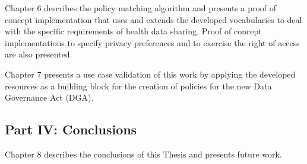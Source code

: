 Chapter 6 describes the policy matching algorithm and presents a proof of concept implementation that uses and extends the developed vocabularies to deal with the specific requirements of health data sharing.
Proof of concept implementations to specify privacy preferences and to exercise the right of access are also presented.

Chapter 7 presents a use case validation of this work by applying the developed resources as a building block for the creation of policies for the new Data Governance Act (DGA).

\subsection*{Part IV: Conclusions}

Chapter 8 describes the conclusions of this Thesis and presents future work.